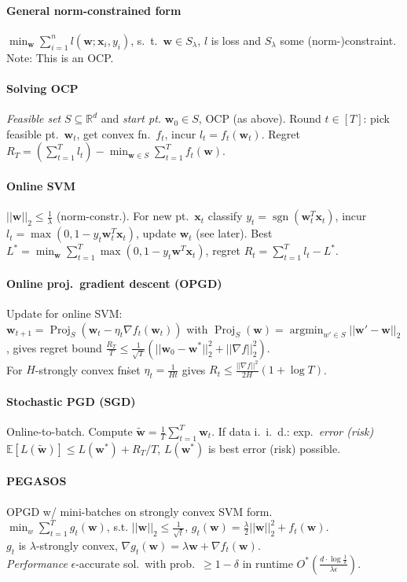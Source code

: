\documentclass[9pt]{scrartcl}
\DeclareMathOperator{\sign}{sgn}
\DeclareMathOperator{\argmin}{argmin}
\DeclareMathOperator{\Proj}{Proj}
\newcommand{\eps}{\epsilon}
\newcommand{\R}{\mathbb{R}}
\newcommand{\E}{\mathbb{E}}
\begin{document}
\begin{twocolumn}
\paragraph{General norm-constrained form} $\min_{\bm w} \sum_{i=1}^{n} l(\bm w; \bm x_i, y_i)$, s.\ t.\ $\bm w \in S_\lambda$, $l$ is loss and $S_\lambda$ some (norm-)constraint. Note: This is an OCP.

\paragraph{Solving OCP}
\emph{Feasible set} $S \subseteq \R^d$ and \emph{start pt.} $\bm w_0 \in S$, OCP (as above).
Round $t \in [T]$: pick feasible pt.\ $\bm w_t$, get convex fn.\ $f_t$, incur $l_t = f_t(\bm w_t)$.
Regret $R_T = (\sum_{t=1}^{T} l_t) - \min_{\bm w \in S}\sum_{t=1}^{T}f_t(\bm w)$.

\paragraph{Online SVM}
$||\bm w||_2 \leq \frac{1}{\lambda}$ (norm-constr.). For new pt.\ $\bm x_t$ classify $y_t = \sign(\bm w_t^T \bm x_t)$,
incur $l_t = \max(0,1-y_t \bm w_t^T \bm x_t)$, update $\bm w_t$ (see later).
Best $L^* = \min_{\bm w}\sum_{t=1}^{T}\max(0,1-y_t \bm w^T \bm x_t)$, regret $R_t = \sum_{t=1}^{T} l_t - L^*$.

\paragraph{Online proj.\ gradient descent (OPGD)}
Update for online SVM: \\
$\bm w_{t+1} = \Proj_S(\bm w_t-\eta_t\nabla f_t(\bm w_t))$ with $\Proj_S(\bm w) = \argmin_{w'\in S} ||\bm w'-\bm w||_2$, gives regret bound $\frac{R_T}{T}\leq\frac{1}{\sqrt{T}}(||\bm w_0-\bm w^*||_2^2+||\nabla f||_2^2)$. \\
For $H$-strongly convex fn\. set $\eta_t = \frac{1}{Ht}$ gives $R_t \leq \frac{||\nabla f||^2}{2H}(1+\log T)$.

\paragraph{Stochastic PGD (SGD)}
Online-to-batch. Compute $\tilde{\bm w} = \frac{1}{T}\sum_{t=1}^{T} \bm w_t$.
If data i.\ i.\ d.: exp.\ \emph{error (risk)} $\E[L(\tilde{\bm w})] \leq L(\bm w^*) + R_T/T$, $L(\bm w^*)$ is best error (risk) possible.

\paragraph{PEGASOS}
OPGD w/ mini-batches on strongly convex SVM form. \\
$\min_w \sum_{t=1}^{T} g_t(\bm w)$, s.t. $||\bm w||_2 \leq \frac{1}{\sqrt t}$, $g_t(\bm w) = \frac{\lambda}{2}||\bm w||_2^2 + f_t(\bm w)$. \\
$g_t$ is $\lambda$-strongly convex, $\nabla g_t(\bm w) = \lambda \bm w + \nabla f_t(\bm w)$. \\
\emph{Performance} $\eps$-accurate sol.\ with prob.\ $\geq 1-\delta$ in runtime $O^*(\frac{d\cdot\log\frac{1}{\delta}}{\lambda\eps}).$


\end{twocolumn}
\end{document}
